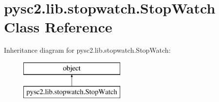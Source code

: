 \hypertarget{classpysc2_1_1lib_1_1stopwatch_1_1_stop_watch}{}\section{pysc2.\+lib.\+stopwatch.\+Stop\+Watch Class Reference}
\label{classpysc2_1_1lib_1_1stopwatch_1_1_stop_watch}
Inheritance diagram for pysc2.\+lib.\+stopwatch.\+Stop\+Watch\+:\begin{figure}[H]
\begin{center}
\leavevmode
\includegraphics[height=2.000000cm]{classpysc2_1_1lib_1_1stopwatch_1_1_stop_watch}
\end{center}
\end{figure}
